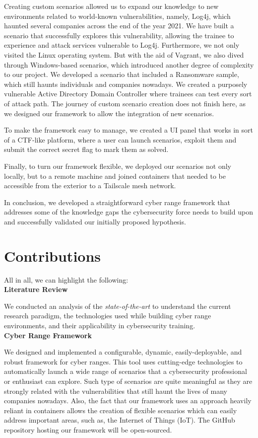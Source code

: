 Creating custom scenarios allowed us to expand our knowledge to new environments related to world-known vulnerabilities, namely, Log4j, which haunted several companies across the end of the year 2021. We have built a scenario that successfully explores this vulnerability, allowing the trainee to experience and attack services vulnerable to Log4j. Furthermore, we not only visited the Linux operating system. But with the aid of Vagrant, we also dived through Windows-based scenarios, which introduced another degree of complexity to our project. We developed a scenario that included a Ransomware sample, which still haunts individuals and companies nowadays. We created a purposely vulnerable Active Directory Domain Controller where trainees can test every sort of attack path. The journey of custom scenario creation does not finish here, as we designed our framework to allow the integration of new scenarios. 

To make the framework easy to manage, we created a UI panel that works in sort of a CTF-like platform, where a user can launch scenarios, exploit them and submit the correct secret flag to mark them as solved. 

Finally, to turn our framework flexible, we deployed our scenarios not only locally, but to a remote machine and joined containers that needed to be accessible from the exterior to a Tailscale mesh network.

In conclusion, we developed a straightforward cyber range framework that addresses some of the knowledge gaps the cybersecurity force needs to build upon and successfully validated our initially proposed hypothesis. 

\section{Contributions} \label{sec:contributions}

All in all, we can highlight the following:\\

\textbf{Literature Review}

We conducted an analysis of the \textit{state-of-the-art} to understand the current research paradigm, the technologies used while building cyber range environments, and their applicability in cybersecurity training.\\

\textbf{Cyber Range Framework}

We designed and implemented a configurable, dynamic, easily-deployable, and robust framework for cyber ranges. This tool uses cutting-edge technologies to automatically launch a wide range of scenarios that a cybersecurity professional or enthusiast can explore. Such type of scenarios are quite meaningful as they are strongly related with the vulnerabilities that still haunt the lives of many companies nowadays. Also, the fact that our framework uses an approach heavily reliant in containers allows the creation of flexible scenarios which can easily address important areas, such as, the Internet of Things (IoT). The GitHub repository hosting our framework will be open-sourced.\\

